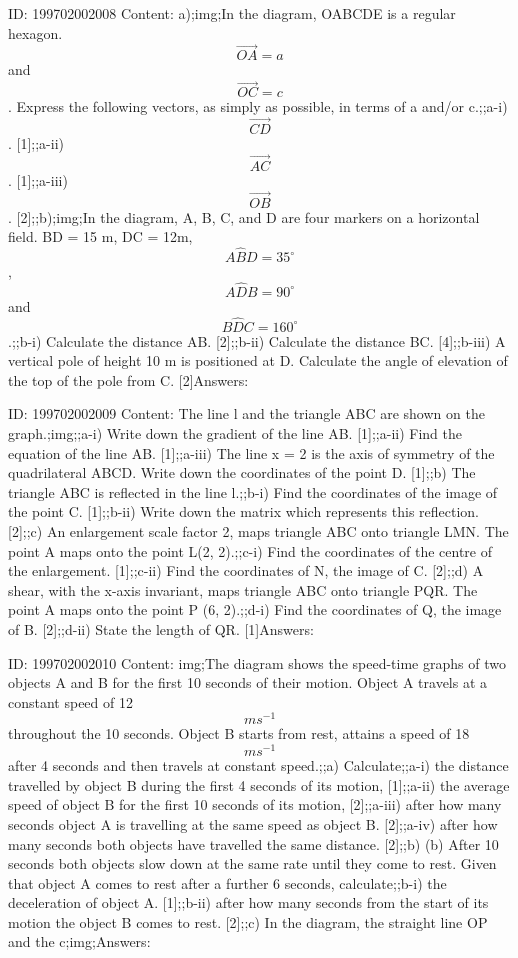 \documentclass{article}
\begin{document}
ID: 199702002008
Content:
a);img;In the diagram, OABCDE is a regular hexagon. $$\vec{OA}=a$$ and $$\vec{OC}=c$$. Express the following vectors, as simply as possible, in terms of a and/or c.;;a-i) $$\vec{CD}$$. [1];;a-ii) $$\vec{AC}$$. [1];;a-iii) $$\vec{OB}$$. [2];;b);img;In the diagram, A, B, C, and D are four markers on a horizontal field. BD = 15 m, DC = 12m, $$A \hat BD=35^{\circ}$$, $$A \hat DB=90^{\circ}$$ and $$B \hat DC=160^{\circ}$$.;;b-i) Calculate the distance AB. [2];;b-ii) Calculate the distance BC. [4];;b-iii) A vertical pole of height 10 m is positioned at D. Calculate the angle of elevation of the top of the pole from C. [2]Answers:

ID: 199702002009
Content:
The line l and the triangle ABC are shown on the graph.;img;;a-i) Write down the gradient of the line AB. [1];;a-ii) Find the equation of the line AB. [1];;a-iii) The line x = 2 is the axis of symmetry of the quadrilateral ABCD. Write down the coordinates of the point D. [1];;b) The triangle ABC is reflected in the line l.;;b-i) Find the coordinates of the image of the point C. [1];;b-ii) Write down the matrix which represents this reflection. [2];;c) An enlargement scale factor 2, maps triangle ABC onto triangle LMN. The point A maps onto the point L(2, 2).;;c-i) Find the coordinates of the centre of the enlargement. [1];;c-ii) Find the coordinates of N, the image of C. [2];;d) A shear, with the x-axis invariant, maps triangle ABC onto triangle PQR. The point A maps onto the point P (6, 2).;;d-i) Find the coordinates of Q, the image of B. [2];;d-ii) State the length of QR. [1]Answers:

ID: 199702002010
Content:
img;The diagram shows the speed-time graphs of two objects A and B for the first 10 seconds of their motion. Object A travels at a constant speed of 12 $$ms^{-1}$$ throughout the 10 seconds. Object B starts from rest, attains a speed of 18 $$ms^{-1}$$ after 4 seconds and then travels at constant speed.;;a) Calculate;;a-i) the distance travelled by object B during the first 4 seconds of its motion, [1];;a-ii) the average speed of object B for the first 10 seconds of its motion, [2];;a-iii) after how many seconds object A is travelling at the same speed as object B. [2];;a-iv) after how many seconds both objects have travelled the same distance. [2];;b) (b)	After 10 seconds both objects slow down at the same rate until they come to rest. Given that object A comes to rest after a further 6 seconds, calculate;;b-i) the deceleration of object A. [1];;b-ii) after how many seconds from the start of its motion the object B comes to  rest. [2];;c) In the diagram, the straight line OP and the c;img;Answers:
\end{document}
